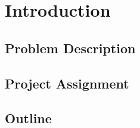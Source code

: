 \chapter{Introduction}

\section{Problem Description}

\section{Project Assignment}

\section{Outline}

